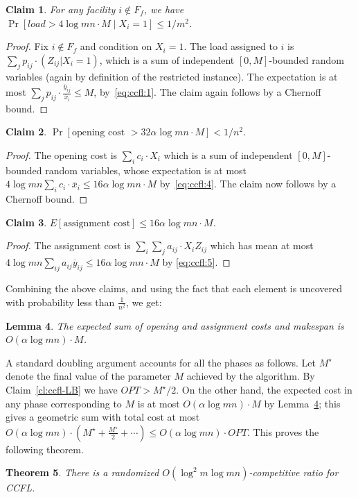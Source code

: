 \documentclass[letterpaper,11pt]{article}
\newtheorem{thm}{Theorem}[section]
\newtheorem{lem}[thm]{Lemma}
\newtheorem{claim}[thm]{Claim}
\newcommand{\ox}{\ensuremath{\overline{x}}\xspace}
\newcommand{\oy}{\ensuremath{\overline{y}}\xspace}
\def\oy{\overline{y}}
\def\ox{\overline{x}}
\begin{document}
\begin{claim}
  For any facility $i\not\in F_f$, we have $\Pr[load > 4\log mn\cdot M
  \mid X_i=1]\le 1/m^2$.
\end{claim}
\begin{proof}
  Fix $i\not\in F_f$ and condition on $X_i=1$. The load assigned to $i$
  is $\sum_j p_{ij}\cdot (Z_{ij}|X_i=1)$, which is a sum of independent
  $[0,M]$-bounded random variables (again by definition of the
  restricted instance). The expectation is at most $\sum_j p_{ij}\cdot
  \frac{\oy_{ij}}{\ox_i} \le M$, by~\eqref{eq:ccfl:1}. The claim again
  follows by a Chernoff bound.
\end{proof}


\begin{claim}
  $\Pr[\mbox{opening cost }> 32\alpha \log mn\cdot M] < 1/n^2$.
\end{claim}
\begin{proof}
  The opening cost is $\sum_i c_i\cdot X_i$ which is a sum of
  independent $[0,M]$-bounded random variables, whose expectation is at
  most $4\log mn \sum_i c_{i}\cdot \ox_i \le 16\alpha \log mn \cdot M$
  by~\eqref{eq:ccfl:4}. The claim now follows by a Chernoff bound.
\end{proof}

\begin{claim}
  $E[\mbox{assignment cost}] \le  16\alpha\log mn \cdot M$.
\end{claim}
\begin{proof}
  The assignment cost is $\sum_i\sum_j a_{ij}\cdot X_iZ_{ij}$ which has
  mean at most $4\log mn \sum_{ij}a_{ij} \oy_{ij}\le 16\alpha\log mn
  \cdot M$ by \eqref{eq:ccfl:5}.
\end{proof}

Combining the above claims, and using the fact that each element is uncovered with probability less than $\frac1{n^2}$,  we get:
\begin{lem}\label{lem:i-ccfl}
  The expected sum of opening and assignment costs and makespan is
  $O(\alpha\log mn)\cdot M$.
\end{lem}

A standard doubling argument accounts for all the phases as follows. Let
$M^\star$ denote the final value of the parameter $M$ achieved by the
algorithm. By Claim~\ref{cl:ccfl-LB} we have $OPT>M^\star/2$. On the other
hand, the expected cost in any phase corresponding to $M$ is at most
$O(\alpha\log mn)\cdot M$ by Lemma~\ref{lem:i-ccfl}; this gives a
geometric sum with total cost at most $O(\alpha\log mn)\cdot
(M^\star+\frac{M^\star}{2}+\cdots )\le O(\alpha\log mn)\cdot OPT$. This proves
the following theorem.
\begin{thm}
  There is a randomized $O(\log^2m \log mn)$-competitive ratio for CCFL.
\end{thm}
\end{document}
